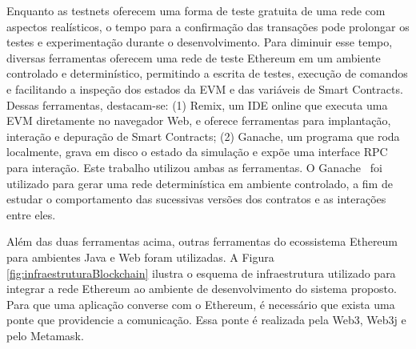 \documentclass[a4paper,11pt]{article}
\begin{document}
Enquanto as testnets oferecem uma forma de teste gratuita de uma rede com aspectos realísticos, o tempo para a confirmação das transações pode prolongar os testes e experimentação durante o desenvolvimento.
Para diminuir esse tempo, diversas ferramentas oferecem uma rede de teste Ethereum em um ambiente controlado e determinístico, permitindo a escrita de testes, execução de comandos e facilitando a inspeção dos estados da EVM e das variáveis de Smart Contracts.
Dessas ferramentas, destacam-se:
(1) Remix, um IDE online que executa uma EVM diretamente no navegador Web, e oferece ferramentas para implantação, interação e depuração de Smart Contracts;
(2) Ganache, um programa que roda localmente, grava em disco o estado da simulação e expõe uma interface RPC para interação. Este trabalho utilizou ambas as ferramentas. O Ganache~\cite{Ganache2020} foi utilizado para gerar uma rede determinística em ambiente controlado, a fim de estudar o comportamento das sucessivas versões dos contratos e as interações entre eles.


Além das duas ferramentas acima, outras ferramentas do ecossistema Ethereum para ambientes Java e Web foram utilizadas. A Figura \ref{fig:infraestruturaBlockchain} ilustra o esquema de infraestrutura utilizado para integrar a rede Ethereum ao ambiente de desenvolvimento do sistema proposto.
Para que uma aplicação converse com o Ethereum, é necessário que exista uma ponte que providencie a comunicação. Essa ponte é realizada pela Web3, Web3j e pelo Metamask.
\end{document}
